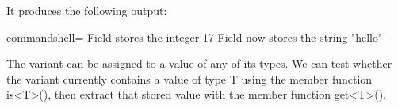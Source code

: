 It produces the following output:

\begin{tcblisting}{commandshell={}}
Field stores the integer 17
Field now stores the string "hello"
\end{tcblisting}

The variant can be assigned to a value of any of its types. We can test whether the variant currently contains a value of type T using the member function is<T>(), then extract that stored value with the member function get<T>().































